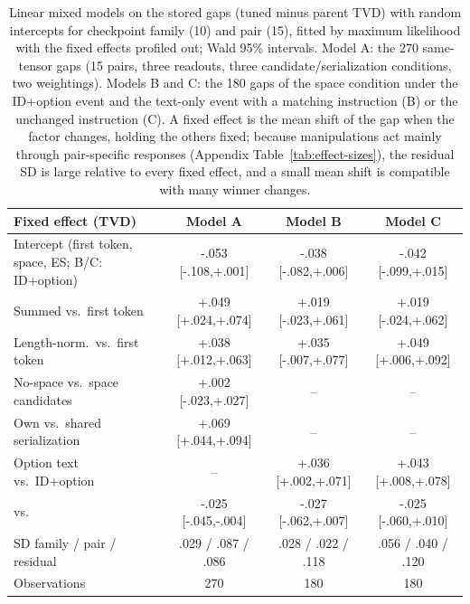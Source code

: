 \begin{table}[t]
\centering\scriptsize
\setlength{\tabcolsep}{3pt}
\begin{tabular}{@{}lccc@{}}
\toprule
Fixed effect (TVD) & Model A & Model B & Model C \\
\midrule
Intercept (first token, space, ES; B/C: ID+option) & -.053 [-.108,+.001] & -.038 [-.082,+.006] & -.042 [-.099,+.015] \\
Summed vs.\ first token & +.049 [+.024,+.074] & +.019 [-.023,+.061] & +.019 [-.024,+.062] \\
Length-norm.\ vs.\ first token & +.038 [+.012,+.063] & +.035 [-.007,+.077] & +.049 [+.006,+.092] \\
No-space vs.\ space candidates & +.002 [-.023,+.027] & -- & -- \\
Own vs.\ shared serialization & +.069 [+.044,+.094] & -- & -- \\
Option text vs.\ ID+option & -- & +.036 [+.002,+.071] & +.043 [+.008,+.078] \\
\PC{} vs.\ \ES{} & -.025 [-.045,-.004] & -.027 [-.062,+.007] & -.025 [-.060,+.010] \\
\midrule
SD family / pair / residual & .029 / .087 / .086 & .028 / .022 / .118 & .056 / .040 / .120 \\
Observations & 270 & 180 & 180 \\
\bottomrule
\end{tabular}
\caption{Linear mixed models on the stored gaps (tuned minus parent TVD) with random intercepts for checkpoint family (10) and pair (15), fitted by maximum likelihood with the fixed effects profiled out; Wald 95\% intervals. Model A: the 270 same-tensor gaps (15 pairs, three readouts, three candidate/serialization conditions, two weightings). Models B and C: the 180 gaps of the space condition under the ID+option event and the text-only event with a matching instruction (B) or the unchanged instruction (C). A fixed effect is the mean shift of the gap when the factor changes, holding the others fixed; because manipulations act mainly through pair-specific responses (Appendix Table~\ref{tab:effect-sizes}), the residual SD is large relative to every fixed effect, and a small mean shift is compatible with many winner changes.}
\label{tab:mixed-model}
\end{table}
